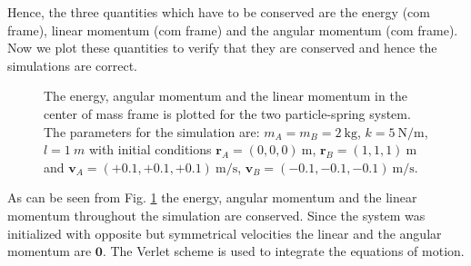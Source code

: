 \documentclass[10pt]{article}
\begin{document}
Hence, the three quantities which have to be conserved are the energy (com frame), linear momentum (com frame) and the angular momentum (com frame). Now we plot these quantities to verify that they are conserved and hence the simulations are correct. 

\begin{figure}[!htb]
\begin{subfigure}{.5\textwidth}
  \centering
  
\end{subfigure}%
\begin{subfigure}{.5\textwidth}
  \centering
  
\end{subfigure}%
\quad
\begin{subfigure}{.5\textwidth}
  \centering
  
\end{subfigure}%
\caption{The energy, angular momentum and the linear momentum in the center of mass frame is plotted for the two particle-spring system. The parameters for the simulation are: $m_{A}=m_{B}=2\ \mathrm{kg}$, $k = 5\ \mathrm{N/m}$, $l=1\ m$ with initial conditions $\bm{r}_{A}=(0, 0, 0)\ \mathrm{m}$, $\bm{r}_{B}=(1, 1, 1)\ \mathrm{m}$ and $\bm{v}_{A}=(+0.1, +0.1, +0.1)\ \mathrm{m/s}$, $\bm{v}_{B}=(-0.1, -0.1, -0.1)\ \mathrm{m/s}$.}
\label{fig:Adv_b}
\end{figure}

As can be seen from Fig. \ref{fig:Adv_b} the energy, angular momentum and the linear momentum throughout the simulation are conserved. Since the system was initialized with opposite but symmetrical velocities the linear and the angular momentum are $\bm{0}$. The Verlet scheme is used to integrate the equations of motion. 
\end{document}
